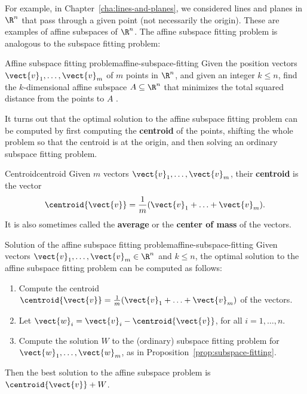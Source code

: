 For example, in Chapter~\ref{cha:lines-and-planes}, we considered
lines and planes in $\R^n$ that pass through a given point (not
necessarily the origin). These are examples of affine subspaces of
$\R^n$. The affine subspace fitting problem is analogous to the
subspace fitting problem:

\begin{problem}{Affine subspace fitting problem}{affine-subspace-fitting}
  Given the position vectors $\vect{v}_1,\ldots,\vect{v}_m$ of $m$
  points in $\R^n$, and given an integer $k\leq n$, find the
  $k$-dimensional affine subspace $A\subseteq\R^n$ that minimizes the
  total squared distance from the points to $A$%
  .
\end{problem}

It turns out that the optimal solution to the affine subspace fitting
problem can be computed by first computing the \textbf{centroid} of
the points, shifting the whole problem so that the centroid is at the
origin, and then solving an ordinary subspace fitting problem.

\begin{definition}{Centroid}{centroid}
  Given $m$ vectors $\vect{v}_1,\ldots,\vect{v}_m$, their
  \textbf{centroid}%
   is the vector
  \begin{equation*}
    \centroid{\vect{v}} = \frac{1}{m}(\vect{v}_1+\ldots+\vect{v}_m).
  \end{equation*}
  It is also sometimes called the \textbf{average}%
   or the \textbf{center of mass}%
   of the vectors.
\end{definition}

\begin{proposition}{Solution of the affine subspace fitting problem}{affine-subspace-fitting}
  Given vectors $\vect{v}_1,\ldots,\vect{v}_m\in\R^n$ and $k\leq n$,
  the optimal solution to the affine subspace fitting problem can be
  computed as follows:
  \begin{enumerate}
  \item Compute the centroid $\centroid{\vect{v}} =
    \frac{1}{m}(\vect{v}_1+\ldots+\vect{v}_m)$ of the vectors.
  \item Let $\vect{w}_i = \vect{v}_i - \centroid{\vect{v}}$, for all
    $i=1,\ldots,n$.
  \item Compute the solution $W$ to the (ordinary) subspace fitting
    problem for $\vect{w}_1,\ldots,\vect{w}_m$, as in
    Proposition~\ref{prop:subspace-fitting}.
  \end{enumerate}
  Then the best solution to the affine subspace problem is
  $\centroid{\vect{v}} + W$.
\end{proposition}

